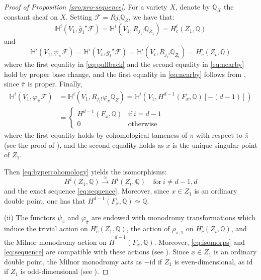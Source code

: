 \documentclass[11pt, reqno]{amsart}
\theoremstyle{plain}
\theoremstyle{definition}
\newcommand{\QQ}{\mathbb{Q}}
\newcommand{\HH}{\mathbb{H}}
\begin{document}
\begin{proof}[Proof of Proposition \ref{pro:pro-sequence}]
For a variety $X$, denote by $\QQ_X$ the constant sheaf on $X$.
Setting $\mathcal{F}= Rj_{!} \QQ_Z$, we have that:
\begin{equation}
\label{eq:pullback}
\HH^i(V_1, {\bar{g}_1}^\star \mathcal{F})= 
\HH^i(V_1,  R_{j_1!}\QQ_{Z_1}) =H^i_c(Z_1, \QQ)
\end{equation}
and 
\begin{equation}
\label{eq:nearby}
\HH^i(V_1, {\psi_{\bar{\pi}} }\mathcal{F})= \HH^i(V_t, {\bar{g}_t}^\star \mathcal{F})=\HH^i(V_t, R_{j_t !} \QQ_{Z_t})=H^i_c(Z_t, \QQ)
\end{equation}
where the first equality in \eqref{eq:pullback} and the second equality in \eqref{eq:nearby} hold by proper base change, and the first equality in \eqref{eq:nearby} follows from \cite[Theorem 4.14]{ML}, since $\bar{\pi}$ is proper. 
Finally, 
\begin{equation}
\label{eq:vanishing}
\begin{aligned}
\HH^i(V_1, {\varphi_{\bar{\pi}} }\mathcal{F})&=\HH^i(V_1, R_{j_1 !} {\varphi_{{\pi}} }\QQ_{Z})= \HH^i(V_1, H^{d-1}(F_x, \QQ)[-(d-1)])\\
& = \left\{ \begin{array}{ll}
H^{d-1}(F_x, \QQ) & \textrm{if} \ i=d-1\\
0 & \textrm{otherwise}
\end{array} \right.
\end{aligned}
\end{equation}
where the first equality holds by cohomological tameness of $\pi$  with respect to $\bar{\pi}$ (see the proof of \cite[Lemma 6.2.14]{Dimca}), and the second equality holds as $x$ is the unique singular point of $Z_1$. 

Then \eqref{eq:hypercohomology} yields  the isomorphisms:
\begin{equation} 
\label{eq:isomorps} 
H^i(Z_1, \QQ) \xrightarrow{\simeq} H^i(Z_t, \QQ) \quad \text{for} \ i \neq d-1,d
\end{equation}
and the exact sequence \eqref{eq:sequence}.
Moreover, since $x \in Z_1$ is an ordinary double point, one has that
$H^{d-1}(F_x, \QQ)\simeq \QQ$.


(ii) The functors $\psi_{\bar{\pi}}$ and $\varphi_{\bar{\pi}}$  
are endowed with monodromy transformations which induce the trivial action on
$H^i_c(Z_1, \QQ)$, the action of $\rho_{\pi,1}$ on $H^i_c(Z_t, \QQ)$, and the Milnor monodromy action on $\widetilde{H}^{d-1}(F_x, \QQ)$. Moreover, \eqref{eq:isomorps} and \eqref{eq:sequence} are compatible with these actions (see \cite[Section 4.2]{Dimca}). Since $x \in Z_1$ is an ordinary double point, the Milnor monodromy acts as $-\mathrm{id}$ if  $Z_1$ is even-dimensional, as $\mathrm{id}$ if $Z_1$ is odd-dimensional (see \cite[Section 3.3]{Dimca}). 

\end{proof}
\end{document}
